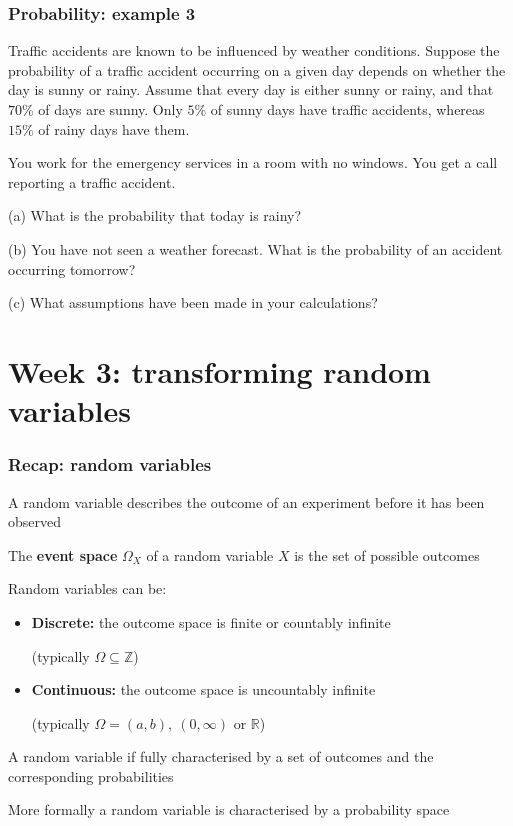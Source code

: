 \documentclass[t,8pt]{beamer}%
\begin{document}
    \begin{frame}
    	\frametitle{Probability: example 3}
    	Traffic accidents are known to be influenced by weather conditions. Suppose the probability of a traffic accident occurring on a given day depends on whether the day is sunny or rainy. Assume that every day is either sunny or rainy, and that $70\%$ of days are sunny. Only $5\%$ of sunny days have traffic accidents, whereas $15\%$ of rainy days have them. \par
        You work for the emergency services in a room with no windows. You get a call reporting a traffic accident. \par
        (a) What is the probability that today is rainy? \par
        (b) You have not seen a weather forecast. What is the probability of an accident occurring tomorrow? \par 
        (c) What assumptions have been made in your calculations?
    \end{frame}
	
\section{Week 3: transforming random variables}

\begin{frame}
\frametitle{Recap: random variables}
A random variable describes the outcome of an experiment before it has been observed \par
The {\bf event space} $\Omega_X$ of a random variable $X$ is the set of possible outcomes \par
Random variables can be:
\begin{itemize}
    \item {\bf Discrete:} the outcome space is finite or countably infinite \par
    (typically $\Omega\subseteq\mathbb Z$)
    \item {\bf Continuous:} the outcome space is uncountably infinite \par
    (typically $\Omega=(a,b),\ (0,\infty)$ or $\mathbb R$)
\end{itemize}
A random variable if fully characterised by a set of outcomes and the corresponding probabilities \par
More formally a random variable is characterised by a probability space
\end{frame}
\end{document}
